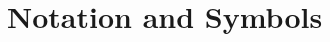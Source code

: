 \documentclass[12pt,a4paper,oneside,pdftex]{report}
\begin{document}
\cleardoublepage
\tableofcontents



\label{pages-prelude}
\cleardoublepage

\startfirstchapter

\pagestyle{headings}


% 


\section{Notation and Symbols}


\end{document}

